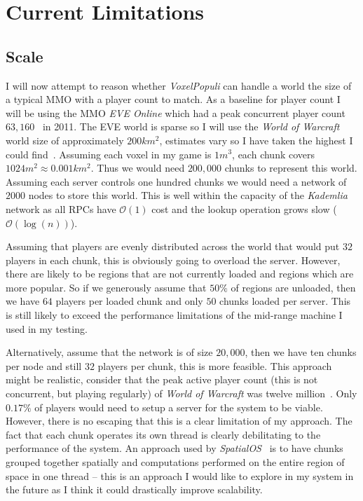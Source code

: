 \documentclass[10pt,twoside,notitlepage,a4paper]{report}
\newcommand{\kademlia}{\emph{Kademlia}}
\newcommand{\voxpop}{\emph{VoxelPopuli}}
\begin{document}
	\section{Current Limitations}
	\label{sec:limits}
	\subsection{Scale}
	I will now attempt to reason whether \voxpop{} can handle a world the size of a typical MMO with a player count to match. As a baseline for player count I will be using the MMO \emph{EVE Online} which had a peak concurrent player count $63,160$~\cite{eve} in 2011. The EVE world is sparse so I will use the \emph{World of Warcraft} world size of approximately $200km^2$, estimates vary so I have taken the highest I could find~\cite{wowsize}. Assuming each voxel in my game is $1m^3$, each chunk covers $1024m^2 \approx 0.001km^2$. Thus we would need $200,000$ chunks to represent this world. Assuming each server controls one hundred chunks we would need a network of $2000$ nodes to store this world. This is well within the capacity of the \kademlia{} network as all RPCs have $\mathcal{O}(1)$ cost and the lookup operation grows slow ($\mathcal{O}(\log(n))$).
	
	Assuming that players are evenly distributed across the world that would put $32$ players in each chunk, this is obviously going to overload the server. However, there are likely to be regions that are not currently loaded and regions which are more popular. So if we generously assume that $50\%$ of regions are unloaded, then we have $64$ players per loaded chunk and only $50$ chunks loaded per server. This is still likely to exceed the performance limitations of the mid-range machine I used in my testing.
	
	Alternatively, assume that the network is of size $20,000$, then we have ten chunks per node and still $32$ players per chunk, this is more feasible. This approach might be realistic, consider that the peak active player count (this is not concurrent, but playing regularly) of \emph{World of Warcraft} was twelve million~\cite{wowbig}. Only $0.17\%$ of players would need to setup a server for the system to be viable. However, there is no escaping that this is a clear limitation of my approach. The fact that each chunk operates its own thread is clearly debilitating to the performance of the system. An approach used by \emph{SpatialOS}~\cite{SpatialOS} is to have chunks grouped together spatially and computations performed on the entire region of space in one thread -- this is an approach I would like to explore in my system in the future as I think it could drastically improve scalability.
	
\end{document}

